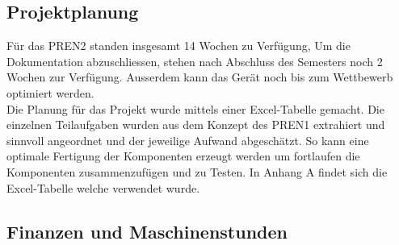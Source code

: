 \subsection{Projektplanung}
Für das PREN2 standen insgesamt 14 Wochen zu Verfügung, Um die Dokumentation 
abzuschliessen, stehen nach Abschluss des Semesters noch 2 Wochen zur 
Verfügung. Ausserdem kann das Gerät noch bis zum Wettbewerb optimiert werden. \\
Die Planung für das Projekt wurde mittels einer Excel-Tabelle gemacht. Die 
einzelnen Teilaufgaben wurden aus dem Konzept des PREN1 extrahiert und 
sinnvoll angeordnet und der jeweilige Aufwand abgeschätzt. So kann eine 
optimale Fertigung der Komponenten erzeugt werden um fortlaufen die 
Komponenten zusammenzufügen und zu Testen. In Anhang 
A
findet sich die Excel-Tabelle welche verwendet wurde.



\subsection{Finanzen und Maschinenstunden}

